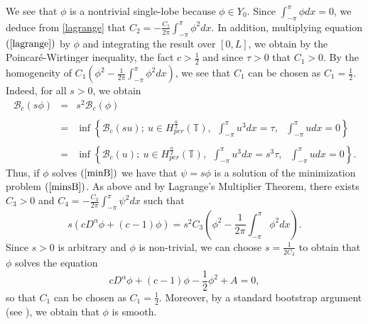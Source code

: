 \documentclass[12pt,reqno]{amsart}
\newcommand{\2}{L^2_{per}(0, T)}
\numberwithin{equation}{section}
\numberwithin{figure}{section}
\begin{document}
We see that $\phi$ is a nontrivial single-lobe because $\phi\in Y_0$. Since $\int_{-\pi}^{\pi}\phi dx =0$, we deduce from \eqref{lagrange} that $C_2=-\frac{C_1}{2\pi}\int_{-\pi}^{\pi}\phi^2dx$. In addition, multiplying equation $(\ref{lagrange})$ by $\phi$ and integrating the result over $[0,L]$, we obtain by the Poincar\'e-Wirtinger inequality, the fact $c>\frac{1}{2}$ and since $\tau>0$ that $C_1>0$. By the homogeneity of $C_1\left(\phi^2-\frac{1}{2\pi}\int_{-\pi}^{\pi}\phi^2dx\right)$, we see that $C_1$ can be chosen as $C_1=\frac{1}{2}$. Indeed, for all $s>0$, we obtain
\begin{equation}\label{minsB}\begin{array}{lllll}
	\mathcal{B}_c(s\phi)&=&\displaystyle s^2\mathcal{B}_c(\phi)\\\\
	&=&\displaystyle\inf\left\{\mathcal{B}_c(su);\ u\in H_{per}^{\frac{\alpha}{2}}(\mathbb{T}),\ \ \int_{-\pi}^{\pi}u^3dx=\tau,\ \ \ \int_{-\pi}^{\pi}udx=0\right\}\\\\
	&=&\displaystyle\inf\left\{\mathcal{B}_c(u);\ u\in H_{per}^{\frac{\alpha}{2}}(\mathbb{T}),\ \ \int_{-\pi}^{\pi}u^3dx=s^3\tau,\ \ \ \int_{-\pi}^{\pi}udx=0\right\}.
\end{array}\end{equation}
Thus, if $\phi$ solves $(\ref{minB})$ we have that $\psi=s\phi$ is a solution of the minimization problem $(\ref{minsB})$. As above and by Lagrange's Multiplier Theorem, there exists $C_3>0$ and $C_4=-\frac{C_3}{2\pi}\int_{-\pi}^{\pi}\psi^2dx$ such that
\begin{equation}\label{lagrange1}
	s\left(\displaystyle cD^{\alpha}\phi +(c -1)\phi\right) = s^2C_3\left(\phi^2 -\frac{1}{2\pi}\int_{-\pi}^{\pi}\phi^2dx\right).
\end{equation}
Since $s>0$ is arbitrary and $\phi$ is non-trivial, we can choose $s=\frac{1}{2C_3}$ to obtain that $\phi$ solves the equation
\begin{equation}\label{ode23}
	cD^{\alpha}\phi +(c -1)\phi - \frac{1}{2}\phi^2 +A =0,
\end{equation}
so that $C_1$ can be chosen as $C_1=\frac{1}{2}$. Moreover, by a standard bootstrap argument (see \cite{CNP}), we obtain that $\phi$ is smooth.\\
\end{document}

